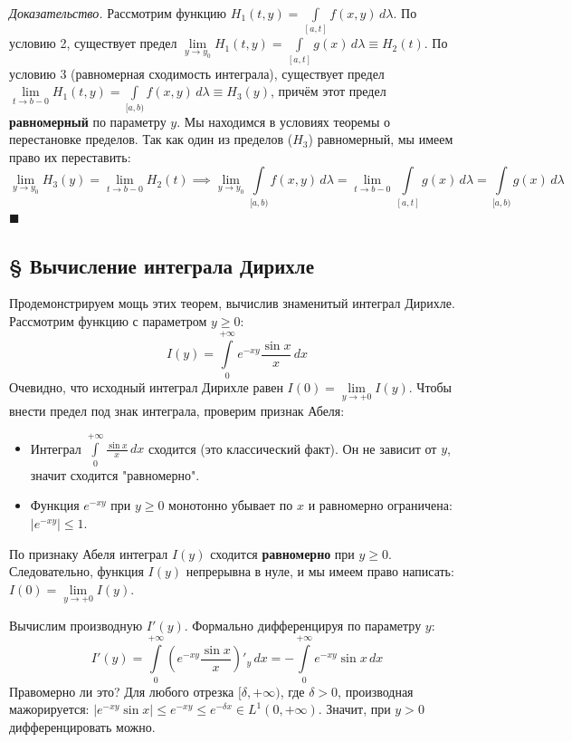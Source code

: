 \documentclass[12pt,a4paper]{article}
\newenvironment{Proof}[1][Доказательство]{\vspace{0.5em}\noindent\textit{#1.}\hspace{0.5em}\ignorespaces}{\hfill$\blacksquare$\vspace{1em}}
\begin{document}
\begin{Proof}
Рассмотрим функцию $H_1(t,y) = \int\limits_{[a,t]} f(x,y) \, d\lambda$. 
По условию 2, существует предел $\lim\limits_{y \to y_0} H_1(t,y) = \int\limits_{[a,t]} g(x) \, d\lambda \equiv H_2(t)$.
По условию 3 (равномерная сходимость интеграла), существует предел $\lim\limits_{t \to b-0} H_1(t,y) = \int\limits_{[a,b)} f(x,y) \, d\lambda \equiv H_3(y)$, причём этот предел \textbf{равномерный} по параметру $y$.
Мы находимся в условиях теоремы о перестановке пределов. Так как один из пределов ($H_3$) равномерный, мы имеем право их переставить:
$$ \lim\limits_{y \to y_0} H_3(y) = \lim\limits_{t \to b-0} H_2(t) \implies \lim\limits_{y \to y_0} \int\limits_{[a,b)} f(x,y) \, d\lambda = \lim\limits_{t \to b-0} \int\limits_{[a,t]} g(x) \, d\lambda = \int\limits_{[a,b)} g(x) \, d\lambda $$
\end{Proof}


\subsection{§ Вычисление интеграла Дирихле}

Продемонстрируем мощь этих теорем, вычислив знаменитый интеграл Дирихле.
Рассмотрим функцию с параметром $y \ge 0$:
$$ I(y) = \int\limits_0^{+\infty} e^{-xy} \frac{\sin x}{x} \, dx $$
Очевидно, что исходный интеграл Дирихле равен $I(0) = \lim\limits_{y \to +0} I(y)$. 
Чтобы внести предел под знак интеграла, проверим признак Абеля:
\begin{itemize}
    \item Интеграл $\int\limits_0^{+\infty} \frac{\sin x}{x} \, dx$ сходится (это классический факт). Он не зависит от $y$, значит сходится "равномерно".
    \item Функция $e^{-xy}$ при $y \ge 0$ монотонно убывает по $x$ и равномерно ограничена: $|e^{-xy}| \le 1$.
\end{itemize}
По признаку Абеля интеграл $I(y)$ сходится \textbf{равномерно} при $y \ge 0$. Следовательно, функция $I(y)$ непрерывна в нуле, и мы имеем право написать: $I(0) = \lim\limits_{y \to +0} I(y)$.

Вычислим производную $I'(y)$. Формально дифференцируя по параметру $y$:
$$ I'(y) = \int\limits_0^{+\infty} \left(e^{-xy} \frac{\sin x}{x}\right)'_y \, dx = -\int\limits_0^{+\infty} e^{-xy} \sin x \, dx $$
Правомерно ли это? Для любого отрезка $[\delta, +\infty)$, где $\delta > 0$, производная мажорируется: $|e^{-xy} \sin x| \le e^{-xy} \le e^{-\delta x} \in L^1(0, +\infty)$. Значит, при $y > 0$ дифференцировать можно.
\end{document}
